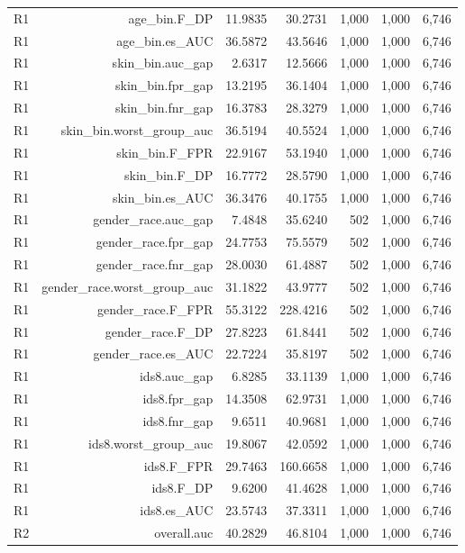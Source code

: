 \documentclass[10pt]{article}
\begin{document}
\begin{longtable}{@{}lrrrrrr@{}}
R1 & age\_bin.F\_DP & 11.9835 & 30.2731 & 1,000 & 1,000 & 6,746 \\
R1 & age\_bin.es\_AUC & 36.5872 & 43.5646 & 1,000 & 1,000 & 6,746 \\
R1 & skin\_bin.auc\_gap & 2.6317 & 12.5666 & 1,000 & 1,000 & 6,746 \\
R1 & skin\_bin.fpr\_gap & 13.2195 & 36.1404 & 1,000 & 1,000 & 6,746 \\
R1 & skin\_bin.fnr\_gap & 16.3783 & 28.3279 & 1,000 & 1,000 & 6,746 \\
R1 & skin\_bin.worst\_group\_auc & 36.5194 & 40.5524 & 1,000 & 1,000 & 6,746 \\
R1 & skin\_bin.F\_FPR & 22.9167 & 53.1940 & 1,000 & 1,000 & 6,746 \\
R1 & skin\_bin.F\_DP & 16.7772 & 28.5790 & 1,000 & 1,000 & 6,746 \\
R1 & skin\_bin.es\_AUC & 36.3476 & 40.1755 & 1,000 & 1,000 & 6,746 \\
R1 & gender\_race.auc\_gap & 7.4848 & 35.6240 & 502 & 1,000 & 6,746 \\
R1 & gender\_race.fpr\_gap & 24.7753 & 75.5579 & 502 & 1,000 & 6,746 \\
R1 & gender\_race.fnr\_gap & 28.0030 & 61.4887 & 502 & 1,000 & 6,746 \\
R1 & gender\_race.worst\_group\_auc & 31.1822 & 43.9777 & 502 & 1,000 & 6,746 \\
R1 & gender\_race.F\_FPR & 55.3122 & 228.4216 & 502 & 1,000 & 6,746 \\
R1 & gender\_race.F\_DP & 27.8223 & 61.8441 & 502 & 1,000 & 6,746 \\
R1 & gender\_race.es\_AUC & 22.7224 & 35.8197 & 502 & 1,000 & 6,746 \\
R1 & ids8.auc\_gap & 6.8285 & 33.1139 & 1,000 & 1,000 & 6,746 \\
R1 & ids8.fpr\_gap & 14.3508 & 62.9731 & 1,000 & 1,000 & 6,746 \\
R1 & ids8.fnr\_gap & 9.6511 & 40.9681 & 1,000 & 1,000 & 6,746 \\
R1 & ids8.worst\_group\_auc & 19.8067 & 42.0592 & 1,000 & 1,000 & 6,746 \\
R1 & ids8.F\_FPR & 29.7463 & 160.6658 & 1,000 & 1,000 & 6,746 \\
R1 & ids8.F\_DP & 9.6200 & 41.4628 & 1,000 & 1,000 & 6,746 \\
R1 & ids8.es\_AUC & 23.5743 & 37.3311 & 1,000 & 1,000 & 6,746 \\
R2 & overall.auc & 40.2829 & 46.8104 & 1,000 & 1,000 & 6,746 \\

\end{longtable}
\end{document}
